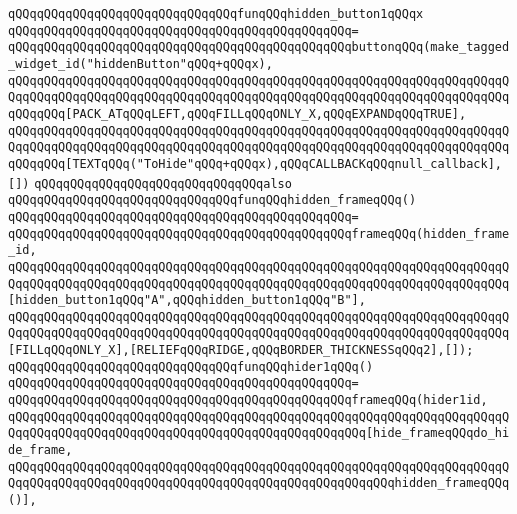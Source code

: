 \verb|qQQqqQQqqQQqqQQqqQQqqQQqqQQqqQQqfunqQQqhidden_button1qQQqx|\newline
\verb|qQQqqQQqqQQqqQQqqQQqqQQqqQQqqQQqqQQqqQQqqQQqqQQq=|\newline
\verb|qQQqqQQqqQQqqQQqqQQqqQQqqQQqqQQqqQQqqQQqqQQqqQQqbuttonqQQq(make_tagged_widget_id("hiddenButton"qQQq+qQQqx),|\newline
\verb|qQQqqQQqqQQqqQQqqQQqqQQqqQQqqQQqqQQqqQQqqQQqqQQqqQQqqQQqqQQqqQQqqQQqqQQqqQQqqQQqqQQqqQQqqQQqqQQqqQQqqQQqqQQqqQQqqQQqqQQqqQQqqQQqqQQqqQQqqQQqqQQqqQQq[PACK_ATqQQqLEFT,qQQqFILLqQQqONLY_X,qQQqEXPANDqQQqTRUE],|\newline
\verb|qQQqqQQqqQQqqQQqqQQqqQQqqQQqqQQqqQQqqQQqqQQqqQQqqQQqqQQqqQQqqQQqqQQqqQQqqQQqqQQqqQQqqQQqqQQqqQQqqQQqqQQqqQQqqQQqqQQqqQQqqQQqqQQqqQQqqQQqqQQqqQQqqQQq[TEXTqQQq("ToHide"qQQq+qQQqx),qQQqCALLBACKqQQqnull_callback],[])|\newline
\newline
\verb|qQQqqQQqqQQqqQQqqQQqqQQqqQQqqQQqalso|\newline
\verb|qQQqqQQqqQQqqQQqqQQqqQQqqQQqqQQqfunqQQqhidden_frameqQQq()|\newline
\verb|qQQqqQQqqQQqqQQqqQQqqQQqqQQqqQQqqQQqqQQqqQQqqQQq=|\newline
\verb|qQQqqQQqqQQqqQQqqQQqqQQqqQQqqQQqqQQqqQQqqQQqqQQqframeqQQq(hidden_frame_id,|\newline
\verb|qQQqqQQqqQQqqQQqqQQqqQQqqQQqqQQqqQQqqQQqqQQqqQQqqQQqqQQqqQQqqQQqqQQqqQQqqQQqqQQqqQQqqQQqqQQqqQQqqQQqqQQqqQQqqQQqqQQqqQQqqQQqqQQqqQQqqQQqqQQq[hidden_button1qQQq"A",qQQqhidden_button1qQQq"B"],|\newline
\verb|qQQqqQQqqQQqqQQqqQQqqQQqqQQqqQQqqQQqqQQqqQQqqQQqqQQqqQQqqQQqqQQqqQQqqQQqqQQqqQQqqQQqqQQqqQQqqQQqqQQqqQQqqQQqqQQqqQQqqQQqqQQqqQQqqQQqqQQqqQQq[FILLqQQqONLY_X],[RELIEFqQQqRIDGE,qQQqBORDER_THICKNESSqQQq2],[]);|\newline
\newline
\verb|qQQqqQQqqQQqqQQqqQQqqQQqqQQqqQQqfunqQQqhider1qQQq()|\newline
\verb|qQQqqQQqqQQqqQQqqQQqqQQqqQQqqQQqqQQqqQQqqQQqqQQq=|\newline
\verb|qQQqqQQqqQQqqQQqqQQqqQQqqQQqqQQqqQQqqQQqqQQqqQQqframeqQQq(hider1id,|\newline
\verb|qQQqqQQqqQQqqQQqqQQqqQQqqQQqqQQqqQQqqQQqqQQqqQQqqQQqqQQqqQQqqQQqqQQqqQQqqQQqqQQqqQQqqQQqqQQqqQQqqQQqqQQqqQQqqQQqqQQqqQQq[hide_frameqQQqdo_hide_frame,|\newline
\verb|qQQqqQQqqQQqqQQqqQQqqQQqqQQqqQQqqQQqqQQqqQQqqQQqqQQqqQQqqQQqqQQqqQQqqQQqqQQqqQQqqQQqqQQqqQQqqQQqqQQqqQQqqQQqqQQqqQQqqQQqqQQqhidden_frameqQQq()],|\newline
